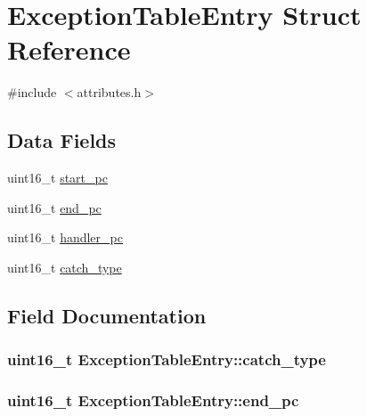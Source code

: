 \hypertarget{structExceptionTableEntry}{}\section{Exception\+Table\+Entry Struct Reference}
\label{structExceptionTableEntry}


{\ttfamily \#include $<$attributes.\+h$>$}

\subsection*{Data Fields}
\begin{DoxyCompactItemize}
\item 
uint16\+\_\+t \hyperlink{structExceptionTableEntry_a2b590ee5474b087686f851f10e3f8f06}{start\+\_\+pc}
\item 
uint16\+\_\+t \hyperlink{structExceptionTableEntry_a876e2f736b1b5f4f081ce96b2923f23e}{end\+\_\+pc}
\item 
uint16\+\_\+t \hyperlink{structExceptionTableEntry_a3fd0ed5cca1781e941594ef0af475add}{handler\+\_\+pc}
\item 
uint16\+\_\+t \hyperlink{structExceptionTableEntry_a7c5ab5cc44557c2e4b92c4643683205d}{catch\+\_\+type}
\end{DoxyCompactItemize}


\subsection{Field Documentation}
\subsubsection[{\texorpdfstring{catch\+\_\+type}{catch_type}}]{\setlength{\rightskip}{0pt plus 5cm}uint16\+\_\+t Exception\+Table\+Entry\+::catch\+\_\+type}\hypertarget{structExceptionTableEntry_a7c5ab5cc44557c2e4b92c4643683205d}{}\label{structExceptionTableEntry_a7c5ab5cc44557c2e4b92c4643683205d}
\subsubsection[{\texorpdfstring{end\+\_\+pc}{end_pc}}]{\setlength{\rightskip}{0pt plus 5cm}uint16\+\_\+t Exception\+Table\+Entry\+::end\+\_\+pc}\hypertarget{structExceptionTableEntry_a876e2f736b1b5f4f081ce96b2923f23e}{}\label{structExceptionTableEntry_a876e2f736b1b5f4f081ce96b2923f23e}
